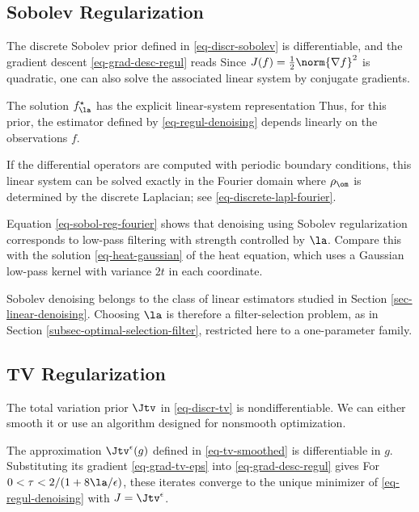 \subsection{Sobolev Regularization}

The discrete Sobolev prior defined in \eqref{eq-discr-sobolev} is differentiable, and the gradient descent \eqref{eq-grad-desc-regul} reads 
Since $J(f)=\frac12\norm{\nabla f}^2$ is quadratic, one can also solve the associated linear system by conjugate gradients.

The solution $f^\star_\la$ has the explicit linear-system representation
Thus, for this prior, the estimator defined by \eqref{eq-regul-denoising} depends linearly on the observations $f$.

If the differential operators are computed with periodic boundary conditions, this linear system can be solved exactly in the Fourier domain
where $\rho_\om$ is determined by the discrete Laplacian; see \eqref{eq-discrete-lapl-fourier}.

Equation \eqref{eq-sobol-reg-fourier} shows that denoising using Sobolev regularization corresponds to low-pass filtering with strength controlled by $\la$. Compare this with the solution \eqref{eq-heat-gaussian} of the heat equation, which uses a Gaussian low-pass kernel with variance $2t$ in each coordinate.

Sobolev denoising belongs to the class of linear estimators studied in Section \ref{sec-linear-denoising}. Choosing $\la$ is therefore a filter-selection problem, as in Section \ref{subsec-optimal-selection-filter}, restricted here to a one-parameter family.


\subsection{TV Regularization}

The total variation prior $\Jtv$ in \eqref{eq-discr-tv} is nondifferentiable. We can either smooth it or use an algorithm designed for nonsmooth optimization.

The approximation $\Jtv^\epsilon(g)$ defined in \eqref{eq-tv-smoothed} is differentiable in $g$.
Substituting its gradient \eqref{eq-grad-tv-eps} into \eqref{eq-grad-desc-regul} gives
For $0<\tau<2/(1+8\la/\epsilon)$, these iterates converge to the unique minimizer of \eqref{eq-regul-denoising} with $J=\Jtv^\epsilon$.

